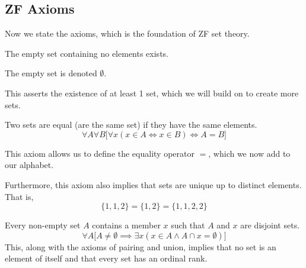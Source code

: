 \documentclass{article}
\begin{document}
  \subsection{ZF Axioms}

    Now we state the axioms, which is the foundation of ZF set theory. 

    \begin{axiom}
      The empty set containing no elements exists. 
    \end{axiom}

    \begin{definition}
      The empty set is denoted $\emptyset$. 
    \end{definition}

    This asserts the existence of at least 1 set, which we will build on to create more sets. 

    \begin{axiom}
      Two sets are equal (are the same set) if they have the same elements. 
      \begin{equation}
        \forall A \forall B \big[ \forall x (x \in A \iff x \in B) \iff A = B\big]
      \end{equation}
    \end{axiom} 

    \begin{definition}[Equality]
      This axiom allows us to define the equality operator $=$, which we now add to our alphabet. 
    \end{definition}

    \begin{theorem}
      Furthermore, this axiom also implies that sets are unique up to distinct elements. That is, 
      \begin{equation}
        \{1, 1, 2\} = \{1, 2\} = \{1, 1, 2, 2\}
      \end{equation}
    \end{theorem}

    \begin{axiom}
      Every non-empty set $A$ contains a member $x$ such that $A$ and $x$ are disjoint sets. 
      \begin{equation}
        \forall A \big[ A \neq \emptyset \implies \exists x (x \in A \land A \cap x = \emptyset) \big]
      \end{equation}
      This, along with the axioms of pairing and union, implies that no set is an element of itself and that every set has an ordinal rank. 
    \end{axiom}
\end{document}
